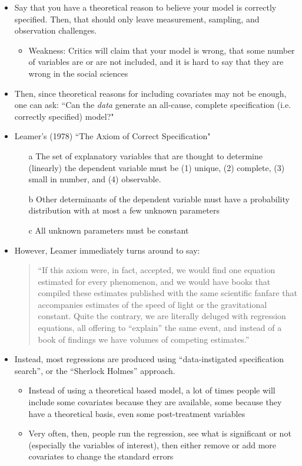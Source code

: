 \documentclass[12pt]{article}
\begin{document}
\begin{itemize}
\item Say that you have a theoretical reason to believe your model is correctly specified.  Then, that should only leave measurement, sampling, and observation challenges.
\begin{itemize}
\item Weakness: Critics will claim that your model is wrong, that some number of variables are or are not included, and it is hard to say that they are wrong in the social sciences
\end{itemize}
\item Then, since theoretical reasons for including covariates may not be enough, one can ask: ``Can the \emph{data} generate an all-cause, complete specification (i.e. correctly specified) model?"
\item Leamer's (1978) ``The Axiom of Correct Specification"
\begin{itemize}
\item[a] The set of explanatory variables that are thought to determine (linearly) the dependent variable must be (1) unique, (2) complete, (3) small in number, and (4) observable.
\item[b] Other determinants of the dependent variable must have a probability distribution with at most a few unknown parameters
\item[c] All unknown parameters must be constant
\end{itemize}

\item However, Leamer immediately turns around to say:
\begin{quote}
``If this axiom were, in fact, accepted, we would find one equation estimated for every phenomenon, and we would have books that compiled these estimates published with the same scientific fanfare that accompanies estimates of the speed of light or the gravitational constant.  Quite the contrary, we are literally deluged with regression equations, all offering to ``explain'' the same event, and instead of a book of findings we have volumes of competing estimates.''
\end{quote}

\item Instead, most regressions are produced using ``data-instigated specification search'', or the ``Sherlock Holmes'' approach.
\begin{itemize}
\item Instead of using a theoretical based model, a lot of times people will include some covariates because they are available, some because they have a theoretical basis, even some post-treatment variables
\item Very often, then, people run the regression, see what is significant or not (especially the variables of interest), then either remove or add more covariates to change the standard errors
\end{itemize}


\end{itemize}
\end{document}
